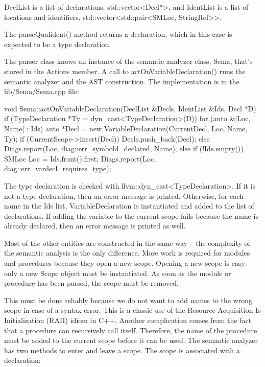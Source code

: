 DeclList is a list of declarations, std::vector<Decl*>, and IdentList is a list of locations and identifiers, std::vector<std::pair<SMLoc, StringRef>{}>.

The parseQualident() method returns a declaration, which in this case is expected to be a type declaration.

The parser class knows an instance of the semantic analyzer class, Sema, that’s stored in the Actions member. A call to actOnVariableDeclaration() runs the semantic analyzer and the AST construction. The implementation is in the lib/Sema/Sema.cpp file:

\begin{cpp}
void Sema::actOnVariableDeclaration(DeclList &Decls,
IdentList &Ids,
Decl *D) {
    if (TypeDeclaration *Ty = dyn_cast<TypeDeclaration>(D)) {
        for (auto &[Loc, Name] : Ids) {
            auto *Decl = new VariableDeclaration(CurrentDecl, Loc,
            Name, Ty);
            if (CurrentScope->insert(Decl))
                Decls.push_back(Decl);
            else
                Diags.report(Loc, diag::err_symbold_declared, Name);
        }
    } else if (!Ids.empty()) {
        SMLoc Loc = Ids.front().first;
        Diags.report(Loc, diag::err_vardecl_requires_type);
    }
}
\end{cpp}

The type declaration is checked with llvm::dyn\_cast<TypeDeclaration>. If it is not a type declaration, then an error message is printed. Otherwise, for each name in the Ids list, VariableDeclaration is instantiated and added to the list of declarations. If adding the variable to the current scope fails because the name is already declared, then an error message is printed as well.

Most of the other entities are constructed in the same way – the complexity of the semantic analysis is the only difference. More work is required for modules and procedures because they open a new scope. Opening a new scope is easy: only a new Scope object must be instantiated. As soon as the module or procedure has been parsed, the scope must be removed.

This must be done reliably because we do not want to add names to the wrong scope in case of a syntax error. This is a classic use of the Resource Acquisition Is Initialization (RAII) idiom in C++. Another complication comes from the fact that a procedure can recursively call itself. Therefore, the name of the procedure must be added to the current scope before it can be used. The semantic analyzer has two methods to enter and leave a scope. The scope is associated with a declaration:

